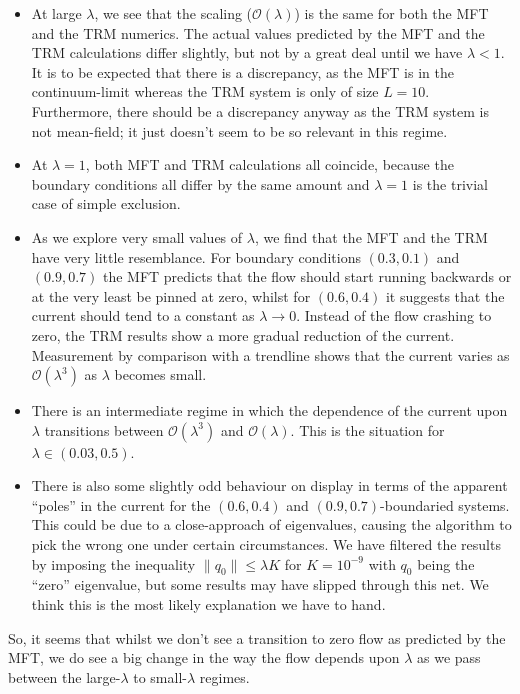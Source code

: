 \begin{itemize}
 \item At large $\lambda$, we see that the scaling ($\mathcal{O}(\lambda)$) is the same for both the MFT
 and the TRM numerics. The actual values predicted by the MFT and the TRM calculations differ slightly,
 but not by a great deal until we have $\lambda < 1$. It is to be expected that there is a discrepancy,
 as the MFT is in the continuum-limit whereas the TRM system is only of size $L=10$. Furthermore, there
 should be a discrepancy anyway as the TRM system is not mean-field; it just doesn't seem to be so relevant
 in this regime.
 \item At $\lambda=1$, both MFT and TRM calculations all coincide, because the boundary conditions all differ
 by the same amount and $\lambda=1$ is the trivial case of simple exclusion.
 \item As we explore very small values of $\lambda$, we find that the MFT and the TRM have very little 
 resemblance. For boundary conditions $(0.3, 0.1)$ and $(0.9, 0.7)$ the MFT predicts that the flow should
 start running backwards or at the very least be pinned at zero,
 whilst for $(0.6, 0.4)$ it suggests that the current should tend to a constant
 as $\lambda \rightarrow 0$. 
 Instead of the flow crashing to zero, the TRM results show a more gradual reduction of the current.
 Measurement by comparison with a trendline shows that the current varies as $\mathcal{O}(\lambda^3)$ as 
 $\lambda$ becomes small.
 \item There is an intermediate regime in which the dependence of the current upon $\lambda$ transitions
 between $\mathcal{O}(\lambda^3)$ and $\mathcal{O}(\lambda)$. This is the situation for $\lambda \in (0.03, 0.5)$.
 \item There is also some slightly odd behaviour on display in terms of the apparent ``poles'' in the 
 current for
the $(0.6, 0.4)$ and $(0.9, 0.7)$-boundaried systems. This could be due to a close-approach of eigenvalues,
causing the algorithm to pick the wrong one under certain circumstances. We have filtered the results by
imposing the inequality $\| q_0 \| \le \lambda K$ for $K=10^{-9}$ with $q_0$ being the ``zero'' eigenvalue,
but some results may have slipped through this net. We think this is the most likely explanation we have to
hand.
\end{itemize}
So, it seems that whilst we don't see a transition to zero flow as predicted by the MFT, we do see
a big change in the way the flow depends upon $\lambda$ as we pass between the large-$\lambda$ to 
small-$\lambda$ regimes.


